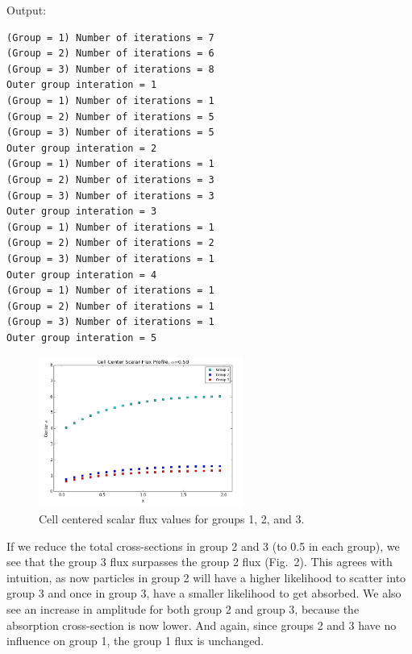 \documentclass[10pt]{article}
\begin{document}


\vspace{10pt}
Output:
\begin{lstlisting}
(Group = 1) Number of iterations = 7
(Group = 2) Number of iterations = 6
(Group = 3) Number of iterations = 8
Outer group interation = 1
(Group = 1) Number of iterations = 1
(Group = 2) Number of iterations = 5
(Group = 3) Number of iterations = 5
Outer group interation = 2
(Group = 1) Number of iterations = 1
(Group = 2) Number of iterations = 3
(Group = 3) Number of iterations = 3
Outer group interation = 3
(Group = 1) Number of iterations = 1
(Group = 2) Number of iterations = 2
(Group = 3) Number of iterations = 1
Outer group interation = 4
(Group = 1) Number of iterations = 1
(Group = 2) Number of iterations = 1
(Group = 3) Number of iterations = 1
Outer group interation = 5
\end{lstlisting}

\begin{figure}[H]
\centering
\includegraphics[width=0.6\textwidth]{Figures/groupcenterfluxes.png}
\vspace{-7pt}
\caption{Cell centered scalar flux values for groups 1, 2, and 3.}
\end{figure}

If we reduce the total cross-sections in group 2 and 3 (to 0.5 in each group), we see that the group 3 flux surpasses the group 2 flux (Fig.~2). This agrees with intuition, as now particles in group 2 will have a higher likelihood to scatter into group 3 and once in group 3, have a smaller likelihood to get absorbed. We also see an increase in amplitude for both group 2 and group 3, because the absorption cross-section is now lower. And again, since groups 2 and 3 have no influence on group 1, the group 1 flux is unchanged.
\end{document}
